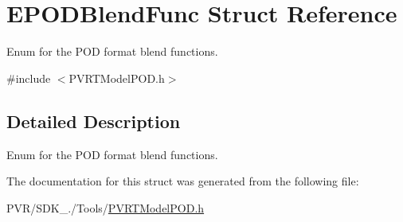 \hypertarget{struct_e_p_o_d_blend_func}{\section{E\+P\+O\+D\+Blend\+Func Struct Reference}
\label{struct_e_p_o_d_blend_func}
}


Enum for the P\+O\+D format blend functions.  




{\ttfamily \#include $<$P\+V\+R\+T\+Model\+P\+O\+D.\+h$>$}



\subsection{Detailed Description}
Enum for the P\+O\+D format blend functions. 



 

The documentation for this struct was generated from the following file\+:\begin{DoxyCompactItemize}
\item 
P\+V\+R/\+S\+D\+K\+\_./\+Tools/\hyperlink{_p_v_r_t_model_p_o_d_8h}{P\+V\+R\+T\+Model\+P\+O\+D.\+h}\end{DoxyCompactItemize}

